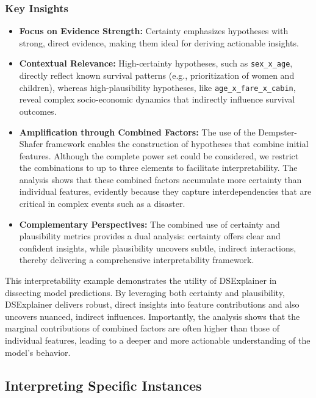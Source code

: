 \documentclass[acmlarge]{acmart}
\begin{document}
\subsubsection{Key Insights}

\begin{itemize}
    \item \textbf{Focus on Evidence Strength:} Certainty emphasizes hypotheses with strong, direct evidence, making them ideal for deriving actionable insights.
    \item \textbf{Contextual Relevance:} High-certainty hypotheses, such as \texttt{sex\_x\_age}, directly reflect known survival patterns (e.g., prioritization of women and children), whereas high-plausibility hypotheses, like \texttt{age\_x\_fare\_x\_cabin}, reveal complex socio-economic dynamics that indirectly influence survival outcomes.
    \item \textbf{Amplification through Combined Factors:} The use of the Dempster-Shafer framework enables the construction of hypotheses that combine initial features. Although the complete power set could be considered, we restrict the combinations to up to three elements to facilitate interpretability. The analysis shows that these combined factors accumulate more certainty than individual features, evidently because they capture interdependencies that are critical in complex events such as a disaster.
    \item \textbf{Complementary Perspectives:} The combined use of certainty and plausibility metrics provides a dual analysis: certainty offers clear and confident insights, while plausibility uncovers subtle, indirect interactions, thereby delivering a comprehensive interpretability framework.
\end{itemize}

This interpretability example demonstrates the utility of DSExplainer in dissecting model predictions. By leveraging both certainty and plausibility, DSExplainer delivers robust, direct insights into feature contributions and also uncovers nuanced, indirect influences. Importantly, the analysis shows that the marginal contributions of combined factors are often higher than those of individual features, leading to a deeper and more actionable understanding of the model's behavior.



\subsection{Interpreting Specific Instances}
\end{document}
